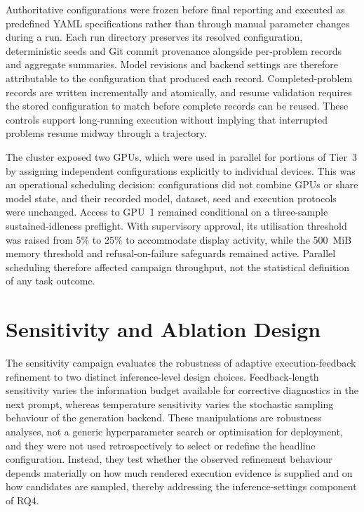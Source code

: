 Authoritative configurations were frozen before final reporting and executed as predefined YAML specifications rather than through manual parameter changes during a run. Each run directory preserves its resolved configuration, deterministic seeds and Git commit provenance alongside per-problem records and aggregate summaries. Model revisions and backend settings are therefore attributable to the configuration that produced each record. Completed-problem records are written incrementally and atomically, and resume validation requires the stored configuration to match before complete records can be reused. These controls support long-running execution without implying that interrupted problems resume midway through a trajectory.

The cluster exposed two GPUs, which were used in parallel for portions of Tier~3 by assigning independent configurations explicitly to individual devices. This was an operational scheduling decision: configurations did not combine GPUs or share model state, and their recorded model, dataset, seed and execution protocols were unchanged. Access to GPU~1 remained conditional on a three-sample sustained-idleness preflight. With supervisory approval, its utilisation threshold was raised from 5\% to 25\% to accommodate display activity, while the 500~MiB memory threshold and refusal-on-failure safeguards remained active. Parallel scheduling therefore affected campaign throughput, not the statistical definition of any task outcome.

\section{Sensitivity and Ablation Design}
\label{sec:sensitivity-design}

The sensitivity campaign evaluates the robustness of adaptive execution-feedback refinement to two distinct inference-level design choices. Feedback-length sensitivity varies the information budget available for corrective diagnostics in the next prompt, whereas temperature sensitivity varies the stochastic sampling behaviour of the generation backend. These manipulations are robustness analyses, not a generic hyperparameter search or optimisation for deployment, and they were not used retrospectively to select or redefine the headline configuration. Instead, they test whether the observed refinement behaviour depends materially on how much rendered execution evidence is supplied and on how candidates are sampled, thereby addressing the inference-settings component of RQ4.

